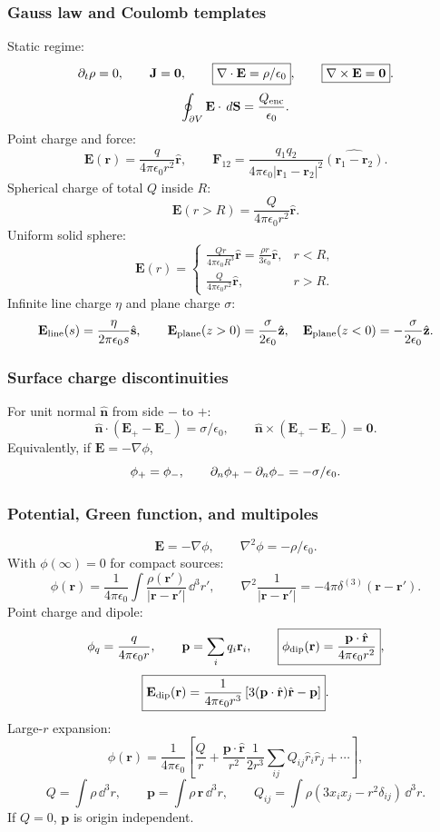 \subsubsection*{Gauss law and Coulomb templates}
Static regime:
\[
\partial_t\rho=0,\qquad \mathbf J=\mathbf0,\qquad
\boxed{\nabla\cdot\mathbf E=\rho/\epsilon_0},\qquad
\boxed{\nabla\times\mathbf E=\mathbf0}.
\]
\[
\oint_{\partial V}\mathbf E\cdot\,d\mathbf S=\frac{Q_{\rm enc}}{\epsilon_0}.
\]
Point charge and force:
\[
\boxed{\mathbf E(\mathbf r)=\frac{q}{4\pi\epsilon_0r^2}\hat{\mathbf r}},\qquad
\boxed{\mathbf F_{12}=\frac{q_1q_2}{4\pi\epsilon_0|\mathbf r_1-\mathbf r_2|^2}
\widehat{(\mathbf r_1-\mathbf r_2)}}.
\]
Spherical charge of total $Q$ inside $R$:
\[
\mathbf E(r>R)=\frac{Q}{4\pi\epsilon_0r^2}\hat{\mathbf r}.
\]
Uniform solid sphere:
\[
\mathbf E(r)=
\begin{cases}
\displaystyle \frac{Qr}{4\pi\epsilon_0R^3}\hat{\mathbf r}
=\frac{\rho r}{3\epsilon_0}\hat{\mathbf r},&r<R,\\[0.6em]
\displaystyle \frac{Q}{4\pi\epsilon_0r^2}\hat{\mathbf r},&r>R.
\end{cases}
\]
Infinite line charge $\eta$ and plane charge $\sigma$:
\[
\mathbf E_{\rm line}(s)=\frac{\eta}{2\pi\epsilon_0s}\hat{\mathbf s},\qquad
\mathbf E_{\rm plane}(z>0)=\frac{\sigma}{2\epsilon_0}\hat{\mathbf z},\quad
\mathbf E_{\rm plane}(z<0)=-\frac{\sigma}{2\epsilon_0}\hat{\mathbf z}.
\]

\subsubsection*{Surface charge discontinuities}
For unit normal $\hat{\mathbf n}$ from side $-$ to $+$:
\[
\boxed{\hat{\mathbf n}\cdot(\mathbf E_+-\mathbf E_-)=\sigma/\epsilon_0},\qquad
\boxed{\hat{\mathbf n}\times(\mathbf E_+-\mathbf E_-)=\mathbf0}.
\]
Equivalently, if $\mathbf E=-\nabla\phi$,
\[
\phi_+=\phi_-,\qquad
\partial_n\phi_+-\partial_n\phi_-=-\sigma/\epsilon_0.
\]

\subsubsection*{Potential, Green function, and multipoles}
\[
\mathbf E=-\nabla\phi,\qquad
\boxed{\nabla^2\phi=-\rho/\epsilon_0}.
\]
With $\phi(\infty)=0$ for compact sources:
\[
\boxed{\phi(\mathbf r)=\frac{1}{4\pi\epsilon_0}\int
\frac{\rho(\mathbf r')}{|\mathbf r-\mathbf r'|}\,\dd^3r'},\qquad
\nabla^2\frac{1}{|\mathbf r-\mathbf r'|}=-4\pi\delta^{(3)}(\mathbf r-\mathbf r').
\]
Point charge and dipole:
\[
\phi_q=\frac{q}{4\pi\epsilon_0r},\qquad
\mathbf p=\sum_i q_i\mathbf r_i,\qquad
\boxed{\phi_{\rm dip}(\mathbf r)=\frac{\mathbf p\cdot\hat{\mathbf r}}{4\pi\epsilon_0r^2}},
\]
\[
\boxed{\mathbf E_{\rm dip}(\mathbf r)=\frac{1}{4\pi\epsilon_0r^3}
\left[3(\mathbf p\cdot\hat{\mathbf r})\hat{\mathbf r}-\mathbf p\right]}.
\]
Large-$r$ expansion:
\[
\phi(\mathbf r)=\frac{1}{4\pi\epsilon_0}\left[
\frac{Q}{r}+\frac{\mathbf p\cdot\hat{\mathbf r}}{r^2}
\frac{1}{2r^3}\sum_{ij}Q_{ij}\hat r_i\hat r_j+\cdots\right],
\]
\[
Q=\int\rho\,\dd^3r,\qquad
\mathbf p=\int\rho\,\mathbf r\,\dd^3r,\qquad
Q_{ij}=\int\rho(3x_ix_j-r^2\delta_{ij})\,\dd^3r.
\]
If $Q=0$, $\mathbf p$ is origin independent. 

